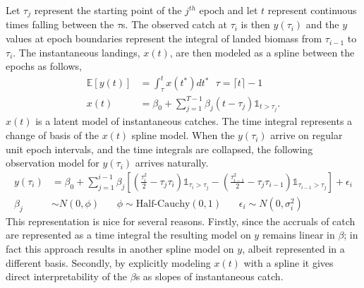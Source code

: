 \documentclass[12pt]{article}
\begin{document}
%
%

%
Let $\tau_j$ represent the starting point of the $j^{th}$ epoch and let $t$ 
represent continuous times falling between the $\tau$s. The observed catch 
at $\tau_i$ is then $y(\tau_i)$ and the $y$ values at epoch boundaries represent 
the integral of landed biomass from $\tau_{i-1}$ to $\tau_i$. The instantaneous 
landings, $x(t)$, are then modeled as a spline between the epochs as follows, %
%
\begin{align}
\mathds{E}[y(t)] &= \int_\tau^{t} x(t^*) dt^* ~~~ \tau=\lceil t \rceil-1 \\
x(t) &= \beta_0 + \sum_{j=1}^{T-1} \beta_j (t-\tau_j) \mathds{1}_{t>\tau_j}.
\end{align}
%
$x(t)$ is a latent model of instantaneous catches. The time integral represents 
a change of basis of the $x(t)$ spline model. When the $y(\tau_i)$ arrive
on regular unit epoch intervals, and the time integrals are collapsed, the 
following observation model for $y(\tau_i)$ arrives naturally. 
\begin{align} %
y(\tau_i) &= \beta_0 + \sum_{j=1}^{i-1} \beta_j \left[ \left(\frac{\tau_i^2}{2}-\tau_j\tau_i\right)\mathds{1}_{\tau_i>\tau_j} - \left(\frac{\tau_{i-1}^2}{2}-\tau_j\tau_{i-1}\right)\mathds{1}_{\tau_{i-1}>\tau_j}\right] + \epsilon_i \\
\beta_j &\sim N(0, \phi) ~~~~ ~~~~ \phi \sim \text{Half-Cauchy}(0, 1) ~~~~ ~~~~ \epsilon_i \sim N(0, \sigma^2_i) \nonumber
\end{align}
%
This representation is nice for several reasons. Firstly, since the accruals 
of catch are represented as a time integral the resulting model on $y$ remains 
linear in $\beta$; in fact this approach results in another spline model on $y$, 
albeit represented in a different basis. Secondly, by explicitly modeling $x(t)$ 
with a spline it gives direct interpretability of the $\beta$s as slopes of 
instantaneous catch.  
\end{document}
